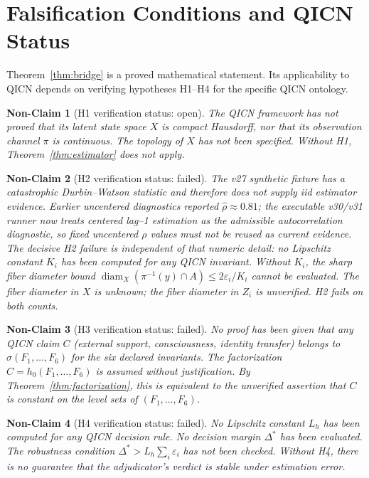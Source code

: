 \documentclass[11pt]{article}
\newtheorem{nonclaim}{Non-Claim}
\begin{document}
\section{Falsification Conditions and QICN Status}
\label{sec:falsification}

Theorem~\ref{thm:bridge} is a proved mathematical statement. Its applicability to QICN depends on verifying hypotheses H1--H4 for the specific QICN ontology.

\begin{nonclaim}[H1 verification status: open]
The QICN framework has not proved that its latent state space $X$ is compact Hausdorff, nor that its observation channel $\pi$ is continuous. The topology of $X$ has not been specified. Without H1, Theorem~\ref{thm:estimator} does not apply.
\end{nonclaim}

\begin{nonclaim}[H2 verification status: failed]
The v27 synthetic fixture has a catastrophic Durbin--Watson statistic and therefore does not supply iid estimator evidence. Earlier uncentered diagnostics reported $\hat\rho\approx 0.81$; the executable v30/v31 runner now treats centered lag--1 estimation as the admissible autocorrelation diagnostic, so fixed uncentered $\rho$ values must not be reused as current evidence. The decisive H2 failure is independent of that numeric detail: no Lipschitz constant $K_i$ has been computed for any QICN invariant. Without $K_i$, the sharp fiber diameter bound $\operatorname{diam}_X(\pi^{-1}(y)\cap A)\leq 2\varepsilon_i/K_i$ cannot be evaluated. The fiber diameter in $X$ is unknown; the fiber diameter in $Z_i$ is unverified. H2 fails on both counts.
\end{nonclaim}

\begin{nonclaim}[H3 verification status: failed]
No proof has been given that any QICN claim $C$ (external support, consciousness, identity transfer) belongs to $\sigma(F_1,\ldots,F_6)$ for the six declared invariants. The factorization $C=h_0(F_1,\ldots,F_6)$ is assumed without justification. By Theorem~\ref{thm:factorization}, this is equivalent to the unverified assertion that $C$ is constant on the level sets of $(F_1,\ldots,F_6)$.
\end{nonclaim}

\begin{nonclaim}[H4 verification status: failed]
No Lipschitz constant $L_h$ has been computed for any QICN decision rule. No decision margin $\Delta^{*}$ has been evaluated. The robustness condition $\Delta^{*}>L_h\sum_i\varepsilon_i$ has not been checked. Without H4, there is no guarantee that the adjudicator's verdict is stable under estimation error.
\end{nonclaim}
\end{document}
